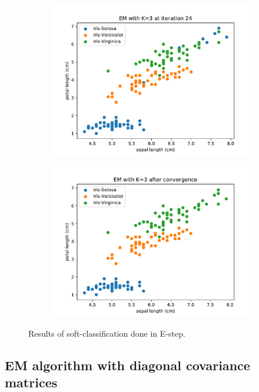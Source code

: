 \documentclass{article}
\begin{document}
\begin{figure}[!ht]
{\begin{subfigure}{0.6\textwidth}
	\includegraphics[width=\textwidth]{./Figures/2_2_EM_iter24}
	\end{subfigure}
	\begin{subfigure}{0.6\textwidth}
	\includegraphics[width=\textwidth]{./Figures/2_2_EM_converged}
	\end{subfigure}
	}	
	\caption{Results of soft-classification done in E-step.}
	\label{2_2_EM_iter}
\end{figure}

\clearpage

\subsection{EM algorithm with diagonal covariance matrices}
\end{document}
